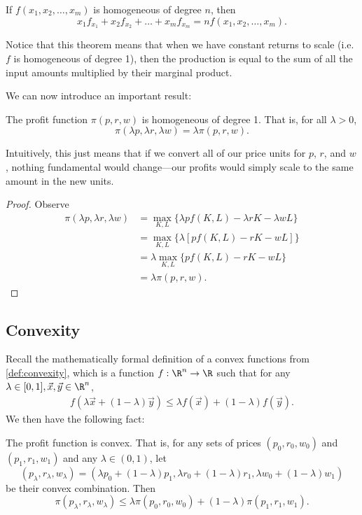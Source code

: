 \begin{theorem*}[Euler] \label{thm:euler}
If $f(x_1, x_2, \ldots, x_m)$ is homogeneous of degree $n$, then 
$$x_{1} f_{x_{1}}+x_{2} f_{x_{2}}+\ldots+x_{m} f_{x_{m}}=n f\left(x_{1}, x_{2}, \ldots, x_{m}\right).$$
\end{theorem*}
Notice that this theorem means that when we have constant returns to scale (i.e. $f$ is homogeneous of degree 1), then the production is equal to the sum of all the input amounts multiplied by their marginal product.

We can now introduce an important result:
\begin{proposition*} \label{prop:homogeneous_one}
The profit function $\pi(p, r, w)$ is homogeneous of degree 1. That is, for all $\lambda > 0$, 
$$\pi(\lambda p, \lambda r, \lambda w) = \lambda \pi(p, r, w).$$
\end{proposition*}
Intuitively, this just means that if we convert all of our price units for $p$, $r$, and $w$, nothing fundamental would change---our profits would simply scale to the same amount in the new units.
\begin{proof}
Observe
$$
\begin{aligned}
\pi(\lambda p, \lambda r, \lambda w)&= \max _{K, L}\{\lambda p f(K, L)-\lambda r K-\lambda w L\} \\
&= \max _{K, L}\{\lambda[p f(K, L)-r K-w L]\} \\
&=\lambda \max _{K, L}\{p f(K, L)-r K-w L\}\\
&=\lambda \pi(p, r, w).
\end{aligned}
$$
\end{proof}

\subsection*{Convexity}
Recall the mathematically formal definition of a convex functions from \ref{def:convexity}, which is a function $f: \R^n \to \R$ such that for any $\lambda \in [0, 1], \vec{x}, \vec{y} \in \R^n$,
\begin{align*}
    f(\lambda \vec{x} + (1 - \lambda) \vec{y}) \leq \lambda f(\vec{x}) + (1 - \lambda) f(\vec{y}).
\end{align*}
We then have the following fact:
\begin{proposition*}
The profit function is convex. That is, for any sets of prices $(p_0, r_0, w_0)$ and $(p_1, r_1, w_1)$ and any $\lambda \in (0, 1)$, let
$$\left(p_{\lambda}, r_{\lambda}, w_{\lambda}\right)=\left(\lambda p_{0}+(1-\lambda) p_{1}, \lambda r_{0}+(1-\lambda) r_{1}, \lambda w_{0}+(1-\lambda) w_{1}\right)$$
be their convex combination. Then 
$$\pi\left(p_{\lambda}, r_{\lambda}, w_{\lambda}\right) \leq \lambda \pi\left(p_{0}, r_{0}, w_{0}\right)+(1-\lambda) \pi\left(p_{1}, r_{1}, w_{1}\right).$$
\end{proposition*}


